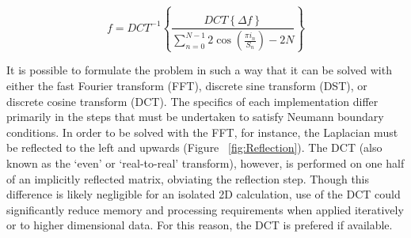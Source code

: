 \begin{equation}
\label{eqn:DCTPoisson}
f = DCT^{-1} \left \{\frac{\displaystyle DCT \left \{ \Delta f \right \}}{\displaystyle \sum_{n=0}^{N-1} 2 \cos \left( \frac{\displaystyle \pi i_n}{\displaystyle S_n} \right) -2N} \right \}
\end{equation}

It is possible to formulate the problem in such a way that it can be solved with either the fast Fourier transform (FFT), discrete sine transform (DST), or discrete cosine transform (DCT).  The specifics of each implementation differ primarily in the steps that must be undertaken to satisfy Neumann boundary conditions.  In order to be solved with the FFT, for instance, the Laplacian must be reflected to the left and upwards (Figure ~\ref{fig:Reflection}).  The DCT (also known as the `even' or `real-to-real' transform), however, is performed on one half of an implicitly reflected matrix, obviating the reflection step.  Though this difference is likely negligible for an isolated 2D calculation, use of the DCT could significantly reduce memory and processing requirements when applied iteratively or to higher dimensional data.  For this reason, the DCT is prefered if available.

